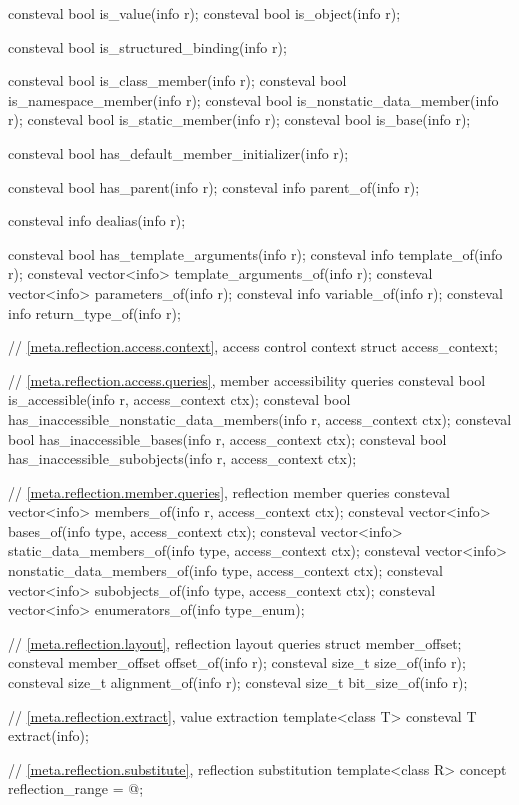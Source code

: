 \begin{codeblock}
{  consteval bool is_value(info r);
  consteval bool is_object(info r);

  consteval bool is_structured_binding(info r);

  consteval bool is_class_member(info r);
  consteval bool is_namespace_member(info r);
  consteval bool is_nonstatic_data_member(info r);
  consteval bool is_static_member(info r);
  consteval bool is_base(info r);

  consteval bool has_default_member_initializer(info r);

  consteval bool has_parent(info r);
  consteval info parent_of(info r);

  consteval info dealias(info r);

  consteval bool has_template_arguments(info r);
  consteval info template_of(info r);
  consteval vector<info> template_arguments_of(info r);
  consteval vector<info> parameters_of(info r);
  consteval info variable_of(info r);
  consteval info return_type_of(info r);

  // \ref{meta.reflection.access.context}, access control context
  struct access_context;

  // \ref{meta.reflection.access.queries}, member accessibility queries
  consteval bool is_accessible(info r, access_context ctx);
  consteval bool has_inaccessible_nonstatic_data_members(info r, access_context ctx);
  consteval bool has_inaccessible_bases(info r, access_context ctx);
  consteval bool has_inaccessible_subobjects(info r, access_context ctx);

  // \ref{meta.reflection.member.queries}, reflection member queries
  consteval vector<info> members_of(info r, access_context ctx);
  consteval vector<info> bases_of(info type, access_context ctx);
  consteval vector<info> static_data_members_of(info type, access_context ctx);
  consteval vector<info> nonstatic_data_members_of(info type, access_context ctx);
  consteval vector<info> subobjects_of(info type, access_context ctx);
  consteval vector<info> enumerators_of(info type_enum);

  // \ref{meta.reflection.layout}, reflection layout queries
  struct member_offset;
  consteval member_offset offset_of(info r);
  consteval size_t size_of(info r);
  consteval size_t alignment_of(info r);
  consteval size_t bit_size_of(info r);

  // \ref{meta.reflection.extract}, value extraction
  template<class T>
    consteval T extract(info);

  // \ref{meta.reflection.substitute}, reflection substitution
  template<class R>
    concept reflection_range = @\seebelow@;

}
\end{codeblock}
